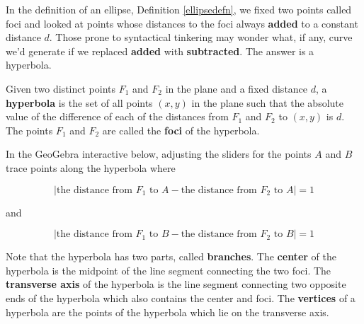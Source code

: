 \documentclass{ximera}
\begin{document}
	\author{Stitz-Zeager}




\setcounter{footnote}{0}

\label{Hyperbolas}

In the definition of an ellipse, Definition \ref{ellipsedefn}, we fixed two points called foci and looked at points whose distances to the foci always \textbf{added} to a constant distance $d$.  Those prone to syntactical tinkering may wonder what, if any, curve we'd generate if we replaced \textbf{added} with \textbf{subtracted}.  The answer is a hyperbola.




\begin{definition} \label{hyperboladefn} Given two distinct points $F_1$ and $F_2$ in the plane and a fixed distance $d$, a   \textbf{hyperbola} is the set of all points $(x, y)$ in the plane such that the absolute value of the difference of each of the distances from $F_1$ and $F_2$  to $(x, y)$ is $d$. The points $F_1$ and $F_2$ are called the  \textbf{foci} of the hyperbola.

\end{definition} 



In the GeoGebra interactive below, adjusting the sliders for the points $A$ and $B$ trace points along the hyperbola where 

\[ \left| \text{the distance from $F_{1}$ to $A$} - \text{the distance from $F_{2}$ to $A$} \right| = 1 \]

and

\[ \left| \text{the distance from $F_{1}$ to $B$} - \text{the distance from $F_{2}$ to $B$} \right| = 1 \]




\begin{center}
\end{center}



Note that the hyperbola has two parts, called  \textbf{branches}.  The \textbf{center} of the hyperbola is the midpoint of the line segment connecting the two foci.  The \textbf{transverse axis} of the hyperbola is the line segment connecting two opposite ends of the hyperbola which also contains the center and foci.  The \textbf{vertices} of a hyperbola are the points of the hyperbola which lie on the transverse axis. 
\end{document}
